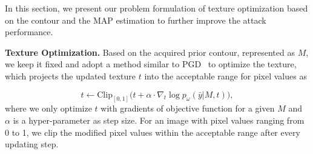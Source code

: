 \documentclass[times,twocolumn,final,authoryear]{elsarticle}
\begin{document}
In this section, we present our problem formulation of texture optimization based on the contour and the MAP estimation to further improve the attack performance.

\textbf{Texture Optimization.} Based on the acquired prior contour, represented as $M$, we keep it fixed and adopt a method similar to PGD~\citep{madry2017towards} to optimize the texture, which projects the updated texture $t$ into the acceptable range for pixel values as 

\begin{equation}
    t \leftarrow \textrm{Clip}_{[0,1]}\big(t + \alpha\cdot\nabla_{t} \log p_\omega(\bar{y}|M,t)\big),
\label{eq:clipattack}
\end{equation}
where we only optimize $t$ with gradients of objective function for a given $M$ and $\alpha$ is a hyper-parameter as step size. For an image with pixel values ranging from 0 to 1, we clip the modified pixel values within the acceptable range after every updating step.
\end{document}
